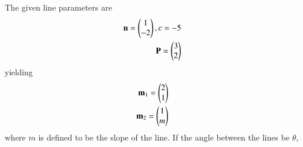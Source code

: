 %
The given line parameters are
\begin{align}
   \mathbf{n}=\begin{pmatrix}1\\-2\end{pmatrix},c=-5\\
	\mathbf{P}=\begin{pmatrix}3\\2\end{pmatrix}
\end{align}
yielding
\begin{align}
\mathbf{m}_1=\begin{pmatrix}2\\1\end{pmatrix}\\
\mathbf{m}_2=\begin{pmatrix}1\\m\end{pmatrix}
\end{align}
where  $m$ is defined to be the slope of the line. If the angle between the lines be $\theta$,

